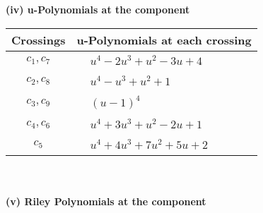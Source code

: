 \documentclass[1p]{elsarticle_modified}
\theoremstyle{definition}
\begin{document}
\newpage\renewcommand{\arraystretch}{1}
\flushleft \textbf{(iv) u-Polynomials at the component}\newline \\
\begin{tabular}{m{50pt}|m{274pt}}
Crossings & \hspace{64pt}u-Polynomials at each crossing \\
\hline $$\begin{aligned}c_{1},c_{7}\end{aligned}$$&$\begin{aligned}
&u^4-2 u^3+u^2-3 u+4
\end{aligned}$\\
\hline $$\begin{aligned}c_{2},c_{8}\end{aligned}$$&$\begin{aligned}
&u^4- u^3+u^2+1
\end{aligned}$\\
\hline $$\begin{aligned}c_{3},c_{9}\end{aligned}$$&$\begin{aligned}
&(u-1)^4
\end{aligned}$\\
\hline $$\begin{aligned}c_{4},c_{6}\end{aligned}$$&$\begin{aligned}
&u^4+3 u^3+u^2-2 u+1
\end{aligned}$\\
\hline $$\begin{aligned}c_{5}\end{aligned}$$&$\begin{aligned}
&u^4+4 u^3+7 u^2+5 u+2
\end{aligned}$\\
\hline
\end{tabular}\\~\\
\newpage\renewcommand{\arraystretch}{1}
\flushleft \textbf{(v) Riley Polynomials at the component}\newline \\
\end{document}
